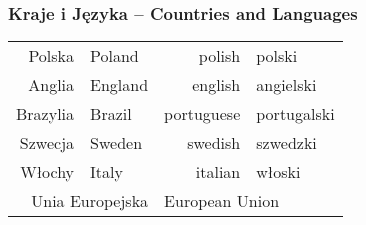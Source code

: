 \documentclass[12pt]{refcard}
\newcommand{\doublel}[1]{\multicolumn{2}{l}{#1}}
\newcommand{\doubler}[1]{\multicolumn{2}{r}{#1}}
\begin{document}
\subsubsection{Kraje i Języka -- Countries and Languages}
\vspace{-1ex}
\begin{tabular}{r@{ -- }lr@{ -- }l}
Polska     & Poland    & polish      & polski      \\
Anglia     & England   & english     & angielski   \\
Brazylia   & Brazil    & portuguese  & portugalski \\
Szwecja    & Sweden    & swedish     & szwedzki    \\
Włochy     & Italy     & italian     & włoski      \\
\doubler{Unia Europejska} & \doublel{European Union} \\
\end{tabular}
\end{document}
